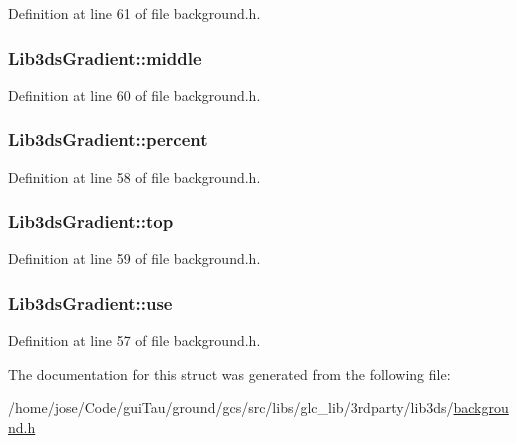 Definition at line 61 of file background.\-h.

\hypertarget{struct_lib3ds_gradient_a7d77e755dd671ed110eacb818f3b86ad}{
\subsubsection[{middle}]{ Lib3ds\-Gradient\-::middle}}\label{struct_lib3ds_gradient_a7d77e755dd671ed110eacb818f3b86ad}


Definition at line 60 of file background.\-h.

\hypertarget{struct_lib3ds_gradient_a8940766aba9f03a0c864a61657cc3cb2}{
\subsubsection[{percent}]{ Lib3ds\-Gradient\-::percent}}\label{struct_lib3ds_gradient_a8940766aba9f03a0c864a61657cc3cb2}


Definition at line 58 of file background.\-h.

\hypertarget{struct_lib3ds_gradient_afdd3df8e1f27f55c5c0fc32df36cd4d9}{
\subsubsection[{top}]{ Lib3ds\-Gradient\-::top}}\label{struct_lib3ds_gradient_afdd3df8e1f27f55c5c0fc32df36cd4d9}


Definition at line 59 of file background.\-h.

\hypertarget{struct_lib3ds_gradient_a5ca72b08538501858a94d8f945280886}{
\subsubsection[{use}]{ Lib3ds\-Gradient\-::use}}\label{struct_lib3ds_gradient_a5ca72b08538501858a94d8f945280886}


Definition at line 57 of file background.\-h.



The documentation for this struct was generated from the following file\-:\begin{DoxyCompactItemize}
\item 
/home/jose/\-Code/gui\-Tau/ground/gcs/src/libs/glc\-\_\-lib/3rdparty/lib3ds/\hyperlink{background_8h}{background.\-h}\end{DoxyCompactItemize}
